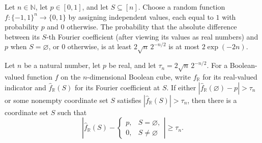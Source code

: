 \begin{theorem}
\label{FABL.measure_pBiasedRandomFunction_fourierCoeff_atThreshold_ge_le}
\leanok
{}
Let $n\in\mathbb{N}$, let $p\in[0,1]$, and let $S\subseteq[n]$. Choose a random function
$f:\{-1,1\}^n\to\{0,1\}$ by assigning independent values, each equal to $1$ with
probability $p$ and $0$ otherwise. The probability that the absolute difference between
its $S$-th Fourier coefficient (after viewing its values as real numbers) and $p$ when
$S=\varnothing$, or $0$ otherwise, is at least $2\sqrt n\,2^{-n/2}$ is at most
$2\exp(-2n)$.
\end{theorem}

\begin{theorem}
\label{FABL.pBiasedFourierFailure_subset}
\leanok
{}
Let $n$ be a natural number, let $p$ be real, and let $\tau_n=2\sqrt n\,2^{-n/2}$. For a
Boolean-valued function $f$ on the $n$-dimensional Boolean cube, write $f_{\mathbb R}$
for its real-valued indicator and $\widehat f_{\mathbb R}(S)$ for its Fourier
coefficient at $S$. If either $|\widehat f_{\mathbb R}(\varnothing)-p|>\tau_n$ or some
nonempty coordinate set $S$ satisfies $|\widehat f_{\mathbb R}(S)|>\tau_n$, then there
is a coordinate set $S$ such that
\[
\left|\widehat f_{\mathbb
R}(S)-\begin{cases}p,&S=\varnothing,\\0,&S\ne\varnothing\end{cases}\right|\ge\tau_n.
\]
\end{theorem}

